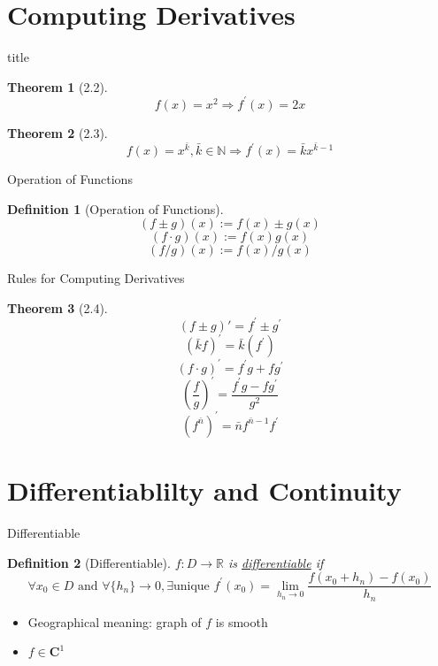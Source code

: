\documentclass[a4paper,11pt]{article}
\newtheorem{defn}{Definition}
\newtheorem{thm}{Theorem}
\begin{document}
\section{Computing Derivatives} %
\label{sec:computing_derivatives}

\begin{frame}[t]{title}
	\begin{thm}
		[2.2]
		\[
			f(x)=x^2 \Rightarrow f^\prime (x) = 2x
		\]
	\end{thm}

	\begin{thm}
		[2.3]
		\[
			f(x)=x^{\bar k} , \bar k \in \mathbb{N} \Rightarrow f^\prime (x) = \bar k x^{\bar k - 1}
		\]
	\end{thm}
\end{frame}

\begin{frame}[t]{Operation of Functions}
	\begin{defn}
		[Operation of Functions]
		\[
			(f\pm g)(x) := f(x)\pm g(x)
		\]
		\[
			(f\cdot g)(x) := f(x)g(x)
		\]\[
			(f/g)(x) := f(x)/g(x)
		\]
	\end{defn}
\end{frame}

\begin{frame}[t]{Rules for Computing Derivatives}
	\begin{thm}
		[2.4]
		\[
			(f\pm g)\prime = f^\prime \pm g^\prime
		\]\[
			(\bar k f)^\prime = \bar k (f^\prime)
		\]\[
			(f\cdot g)^\prime = f^\prime g + f g^\prime 
		\]\[
			\left(\frac{f}{g}\right)^\prime = \frac{f^\prime g - fg^\prime}{g^2}
		\]\[
			(f^{\bar n})^\prime = \bar n f^{\bar n - 1} f^\prime 
		\]
	\end{thm}
\end{frame}


\section{Differentiablilty and Continuity} %
\label{sec:differentiablilty_and_continuity}
\begin{frame}[t]{Differentiable}
	\begin{defn}
		[Differentiable]
		$f:D\rightarrow \mathbb{R}$ is \uline{differentiable} if \[
			\forall x_0\in D\text{ and }\forall\{h_n\}\rightarrow 0, \exists \text{unique } f^\prime(x_0) = \lim_{h_n\rightarrow 0}\frac{f(x_0+h_n)-f(x_0)}{h_n}
		\]
	\end{defn}
	\begin{itemize}
		\item Geographical meaning: graph of $f$ is smooth
		\item $f\in \mathbf{C}^1$
	\end{itemize}
\end{frame}
\end{document}
